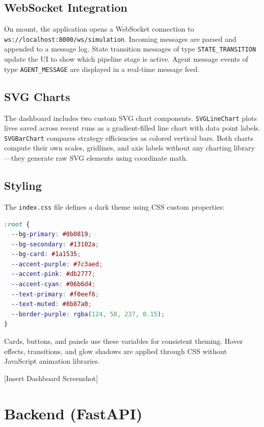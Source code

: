 \subsection{WebSocket Integration}

On mount, the application opens a WebSocket connection to \texttt{ws://localhost:8000/ws/simulation}. Incoming messages are parsed and appended to a message log. State transition messages of type \texttt{STATE\_TRANSITION} update the UI to show which pipeline stage is active. Agent message events of type \texttt{AGENT\_MESSAGE} are displayed in a real-time message feed.

\subsection{SVG Charts}

The dashboard includes two custom SVG chart components. \texttt{SVGLineChart} plots lives saved across recent runs as a gradient-filled line chart with data point labels. \texttt{SVGBarChart} compares strategy efficiencies as colored vertical bars. Both charts compute their own scales, gridlines, and axis labels without any charting library---they generate raw SVG elements using coordinate math.

\subsection{Styling}

The \texttt{index.css} file defines a dark theme using CSS custom properties:

\begin{lstlisting}[style=codestyle, language=CSS, caption=CSS custom properties for dark theme]
:root {
  --bg-primary: #0b0819;
  --bg-secondary: #13102a;
  --bg-card: #1a1535;
  --accent-purple: #7c3aed;
  --accent-pink: #db2777;
  --accent-cyan: #06b6d4;
  --text-primary: #f0eef6;
  --text-muted: #8b87a0;
  --border-purple: rgba(124, 58, 237, 0.15);
}
\end{lstlisting}

Cards, buttons, and panels use these variables for consistent theming. Hover effects, transitions, and glow shadows are applied through CSS without JavaScript animation libraries.

[Insert Dashboard Screenshot]

\section{Backend (FastAPI)}
\label{sec:impl_backend}


